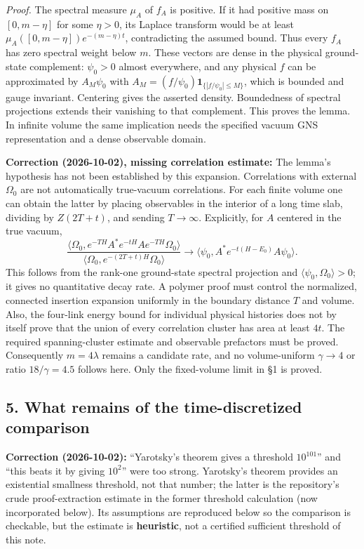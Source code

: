 \documentclass[11pt,a4paper]{article}
\begin{document}
\emph{Proof.} The spectral measure \(\mu_A\) of \(f_A\) is positive. If
it had positive mass on \([0,m-\eta]\) for some \(\eta>0\), its Laplace
transform would be at least \(\mu_A([0,m-\eta])e^{-(m-\eta)t}\),
contradicting the assumed bound. Thus every \(f_A\) has zero spectral
weight below \(m\). These vectors are dense in the physical ground-state
complement: \(\psi_0>0\) almost everywhere, and any physical \(f\) can
be approximated by \(A_M\psi_0\) with
\(A_M=(f/\psi_0)\mathbf1_{\{|f/\psi_0|\le M\}}\), which is bounded and
gauge invariant. Centering gives the asserted density. Boundedness of
spectral projections extends their vanishing to that complement. This
proves the lemma. In infinite volume the same implication needs the
specified vacuum GNS representation and a dense observable domain.

\textbf{Correction (2026-10-02), missing correlation estimate:} The
lemma's hypothesis has not been established by this expansion.
Correlations with external \(\Omega_0\) are not automatically
true-vacuum correlations. For each finite volume one can obtain the
latter by placing observables in the interior of a long time slab,
dividing by \(Z(2T+t)\), and sending \(T\to\infty\). Explicitly, for
\(A\) centered in the true vacuum,
\[\frac{\langle\Omega_0,e^{-TH}A^*e^{-tH}Ae^{-TH}\Omega_0\rangle}
{\langle\Omega_0,e^{-(2T+t)H}\Omega_0\rangle}
\longrightarrow\langle\psi_0,A^*e^{-t(H-E_0)}A\psi_0\rangle.\] This
follows from the rank-one ground-state spectral projection and
\(\langle\psi_0,\Omega_0\rangle>0\); it gives no quantitative decay
rate. A polymer proof must control the normalized, connected insertion
expansion uniformly in the boundary distance \(T\) and volume. Also, the
four-link energy bound for individual physical histories does not by
itself prove that the union of every correlation cluster has area at
least \(4t\). The required spanning-cluster estimate and observable
prefactors must be proved. Consequently \(m=4\lambda\) remains a
candidate rate, and no volume-uniform \(\gamma\to4\) or ratio
\(18/\gamma=4.5\) follows here. Only the fixed-volume limit in §1 is
proved.

\hypertarget{what-remains-of-the-time-discretized-comparison}{%
\subsection{5. What remains of the time-discretized
comparison}\label{what-remains-of-the-time-discretized-comparison}}

\textbf{Correction (2026-10-02):} ``Yarotsky's theorem gives a threshold
\(10^{101}\)'' and ``this beats it by giving \(10^2\)'' were too strong.
Yarotsky's theorem provides an existential smallness threshold, not that
number; the latter is the repository's crude proof-extraction estimate
in the former threshold calculation (now incorporated below). Its
assumptions are reproduced below so the comparison is checkable, but the
estimate is \textbf{heuristic}, not a certified sufficient threshold of
this note.
\end{document}
